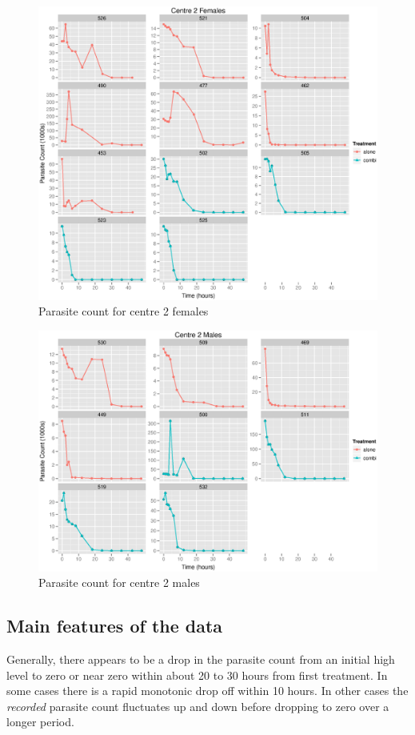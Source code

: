 \begin{figure}[h]
\centering
\includegraphics[width=150mm]{raw2f.eps}
\caption{Parasite count for centre 2 females}\label{raw2F}
\end{figure} 
\begin{figure}[h]
\centering
\includegraphics[width=150mm]{raw2m.eps}
\caption{Parasite count for centre 2 males}\label{raw2M}
\end{figure} 
\subsection{Main features of the data}
Generally, there appears to be a drop in the parasite count from an initial high level to zero or near zero within about 20 to 30 hours from first treatment. In some cases there is a rapid monotonic drop off within 10 hours. In other cases the \textit{recorded} parasite count fluctuates up and down before dropping to zero over a longer period.

